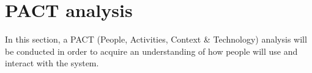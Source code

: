 \section{PACT analysis} \label{PACTAnalysis}
In this section, a PACT (People, Activities, Context \& Technology) analysis will be conducted in order to acquire an understanding of how people will use and interact with the system.